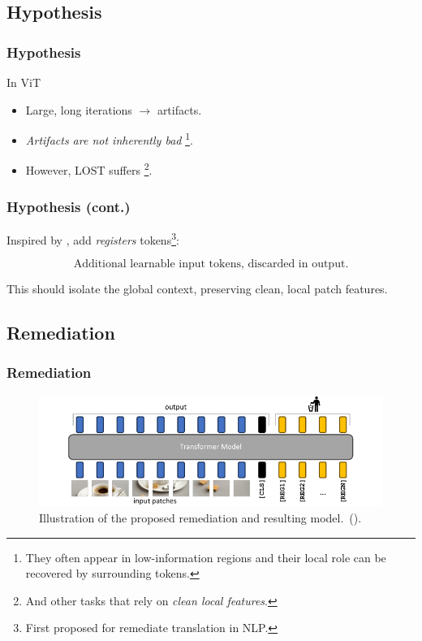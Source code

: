 \documentclass[aspectratio=169]{beamer}
\begin{document}
\subsection{Hypothesis}

\begin{frame}
\frametitle{Hypothesis}
In ViT
\begin{itemize}
    \item Large, long iterations $\rightarrow$ artifacts.
    \item \emph{Artifacts are not inherently bad} \footnote{They often appear in low-information regions and their local role can be recovered by surrounding tokens.}.
    \item However, LOST suffers \footnote{And other tasks that rely on \emph{clean local features}.}.
\end{itemize}
\end{frame}

\begin{frame}
\frametitle{Hypothesis (cont.)}
Inspired by \cite{bulatovRecurrentMemoryTransformer2022}, add \emph{registers} tokens\footnote{First proposed for remediate translation in NLP.}:

$$
\boxed{\text{Additional learnable input tokens, discarded in output.}}
$$

\vspace{1em}
This should isolate the global context, preserving clean, local patch features.
\end{frame}


\subsection{Remediation}
\begin{frame}
\frametitle{Remediation}
\begin{figure}[t]
    \centering
    \includegraphics{resources/model.pdf} 
    \caption{
      Illustration of the proposed remediation and resulting model.~(\cite{darcetVisionTransformersNeed2024}).
    }  
    \vspace{-1em}
    \label{fig:model}
  \end{figure}
\end{frame}
\end{document}
